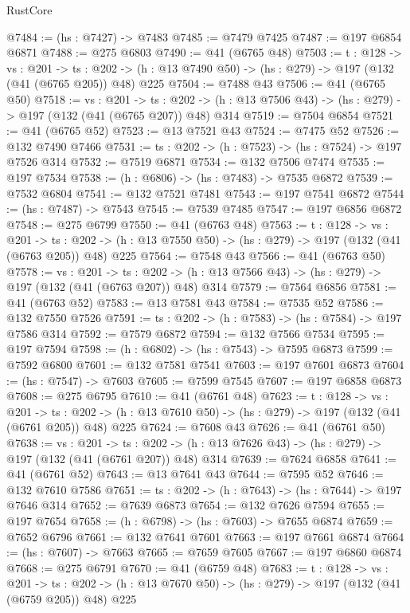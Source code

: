 \begin{lexlean}{RustCore}
\begin{coremodule}
@7484 := (hs : @7427) -> @7483
@7485 := @7479 @7425
@7487 := @197 @6854 @6871
@7488 := @275 @6803
@7490 := @41 (@6765 @48)
@7503 := {t : @128} ->
  {vs : @201} ->
  {ts : @202} -> (h : @13 @7490 @50) -> (hs : @279) -> @197 (@132 (@41 (@6765 @205)) @48) @225
@7504 := @7488 @43
@7506 := @41 (@6765 @50)
@7518 := {vs : @201} ->
  {ts : @202} -> (h : @13 @7506 @43) -> (hs : @279) -> @197 (@132 (@41 (@6765 @207)) @48) @314
@7519 := @7504 @6854
@7521 := @41 (@6765 @52)
@7523 := @13 @7521 @43
@7524 := @7475 @52
@7526 := @132 @7490 @7466
@7531 := {ts : @202} -> (h : @7523) -> (hs : @7524) -> @197 @7526 @314
@7532 := @7519 @6871
@7534 := @132 @7506 @7474
@7535 := @197 @7534
@7538 := (h : @6806) -> (hs : @7483) -> @7535 @6872
@7539 := @7532 @6804
@7541 := @132 @7521 @7481
@7543 := @197 @7541 @6872
@7544 := (hs : @7487) -> @7543
@7545 := @7539 @7485
@7547 := @197 @6856 @6872
@7548 := @275 @6799
@7550 := @41 (@6763 @48)
@7563 := {t : @128} ->
  {vs : @201} ->
  {ts : @202} -> (h : @13 @7550 @50) -> (hs : @279) -> @197 (@132 (@41 (@6763 @205)) @48) @225
@7564 := @7548 @43
@7566 := @41 (@6763 @50)
@7578 := {vs : @201} ->
  {ts : @202} -> (h : @13 @7566 @43) -> (hs : @279) -> @197 (@132 (@41 (@6763 @207)) @48) @314
@7579 := @7564 @6856
@7581 := @41 (@6763 @52)
@7583 := @13 @7581 @43
@7584 := @7535 @52
@7586 := @132 @7550 @7526
@7591 := {ts : @202} -> (h : @7583) -> (hs : @7584) -> @197 @7586 @314
@7592 := @7579 @6872
@7594 := @132 @7566 @7534
@7595 := @197 @7594
@7598 := (h : @6802) -> (hs : @7543) -> @7595 @6873
@7599 := @7592 @6800
@7601 := @132 @7581 @7541
@7603 := @197 @7601 @6873
@7604 := (hs : @7547) -> @7603
@7605 := @7599 @7545
@7607 := @197 @6858 @6873
@7608 := @275 @6795
@7610 := @41 (@6761 @48)
@7623 := {t : @128} ->
  {vs : @201} ->
  {ts : @202} -> (h : @13 @7610 @50) -> (hs : @279) -> @197 (@132 (@41 (@6761 @205)) @48) @225
@7624 := @7608 @43
@7626 := @41 (@6761 @50)
@7638 := {vs : @201} ->
  {ts : @202} -> (h : @13 @7626 @43) -> (hs : @279) -> @197 (@132 (@41 (@6761 @207)) @48) @314
@7639 := @7624 @6858
@7641 := @41 (@6761 @52)
@7643 := @13 @7641 @43
@7644 := @7595 @52
@7646 := @132 @7610 @7586
@7651 := {ts : @202} -> (h : @7643) -> (hs : @7644) -> @197 @7646 @314
@7652 := @7639 @6873
@7654 := @132 @7626 @7594
@7655 := @197 @7654
@7658 := (h : @6798) -> (hs : @7603) -> @7655 @6874
@7659 := @7652 @6796
@7661 := @132 @7641 @7601
@7663 := @197 @7661 @6874
@7664 := (hs : @7607) -> @7663
@7665 := @7659 @7605
@7667 := @197 @6860 @6874
@7668 := @275 @6791
@7670 := @41 (@6759 @48)
@7683 := {t : @128} ->
  {vs : @201} ->
  {ts : @202} -> (h : @13 @7670 @50) -> (hs : @279) -> @197 (@132 (@41 (@6759 @205)) @48) @225

\end{coremodule}
\end{lexlean}
